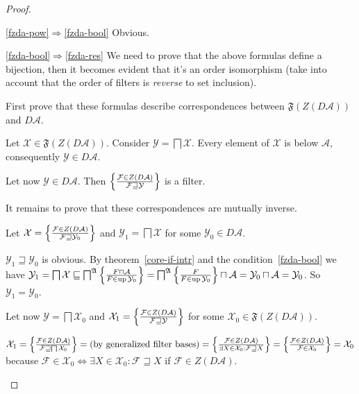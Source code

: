 \begin{proof}
~
\begin{widedisorder}

\item[\ref{fzda-pow}$\Rightarrow$\ref{fzda-bool}]
Obvious.

\item[\ref{fzda-bool}$\Rightarrow$\ref{fzda-res}]
  We need to prove that the above formulas define a bijection, then it becomes
  evident that it's an order isomorphism (take into account that the order of
  filters is \emph{reverse} to set inclusion).

  First prove that these formulas describe correspondences between
  $\mathfrak{F} (Z (D \mathcal{A}))$ and $D \mathcal{A}$.

  Let $\mathcal{X} \in \mathfrak{F} (Z (D \mathcal{A}))$. Consider
  $\mathcal{Y} = \bigsqcap \mathcal{X}$. Every element of $\mathcal{X}$ is
  below $\mathcal{A}$, consequently $\mathcal{Y} \in D \mathcal{A}$.

  Let now $\mathcal{Y} \in D \mathcal{A}$. Then $\left\{ \frac{ \mathcal{F} \in Z (D
  \mathcal{A}) }{ \mathcal{F} \sqsupseteq \mathcal{Y}
  }\right\}$ is a filter.

  It remains to prove that these correspondences are mutually inverse.

  Let $\mathcal{X} = \left\{ \frac{ \mathcal{F} \in Z (D \mathcal{A}) }{
  \mathcal{F} \sqsupseteq \mathcal{Y}_0 }\right\}$ and
  $\mathcal{Y}_1 = \bigsqcap \mathcal{X}$ for some $\mathcal{Y}_0 \in D
  \mathcal{A}$.

  $\mathcal{Y}_1 \sqsupseteq \mathcal{Y}_0$ is obvious. By theorem~\ref{core-if-intr} and the
  condition~\ref{fzda-bool} we have $\mathcal{Y}_1 = \bigsqcap \mathcal{X} \sqsubseteq
  \bigsqcap^{\mathfrak{A}} \left\{ \frac{ F \sqcap \mathcal{A} }{
  F \in \operatorname{up} \mathcal{Y}_0 }\right\} =
  \bigsqcap^{\mathfrak{A}} \left\{ \frac{ F }{ F \in
  \operatorname{up} \mathcal{Y}_0 }\right\} \sqcap \mathcal{A} = \mathcal{Y}_0 \sqcap
  \mathcal{A} = \mathcal{Y}_0$. So $\mathcal{Y}_1 = \mathcal{Y}_0$.

  Let now $\mathcal{Y} = \bigsqcap \mathcal{X}_0$ and $\mathcal{X}_1 = \left\{ \frac{
  \mathcal{F} \in Z (D \mathcal{A}) }{ \mathcal{F}
  \sqsupseteq \mathcal{Y} }\right\}$ for some $\mathcal{X}_0 \in \mathfrak{F}
  (Z (D \mathcal{A}))$.

  $\mathcal{X}_1 = \left\{ \frac{ \mathcal{F} \in Z (D \mathcal{A}) }{
  \mathcal{F} \sqsupseteq \bigsqcap \mathcal{X}_0 }\right\} =
  \text{(by generalized filter bases)} = \left\{ \frac{ \mathcal{F} \in Z (D
  \mathcal{A}) }{ \exists X \in \mathcal{X}_0 :
  \mathcal{F} \sqsupseteq X }\right\} = \left\{ \frac{ \mathcal{F} \in Z (D
  \mathcal{A}) }{ \mathcal{F} \in \mathcal{X}_0
  }\right\} = \mathcal{X}_0$ because $\mathcal{F} \in \mathcal{X}_0
  \Leftrightarrow \exists X \in \mathcal{X}_0 : \mathcal{F} \sqsupseteq X$ if
  $\mathcal{F} \in Z (D \mathcal{A})$.
\end{widedisorder}
\end{proof}


